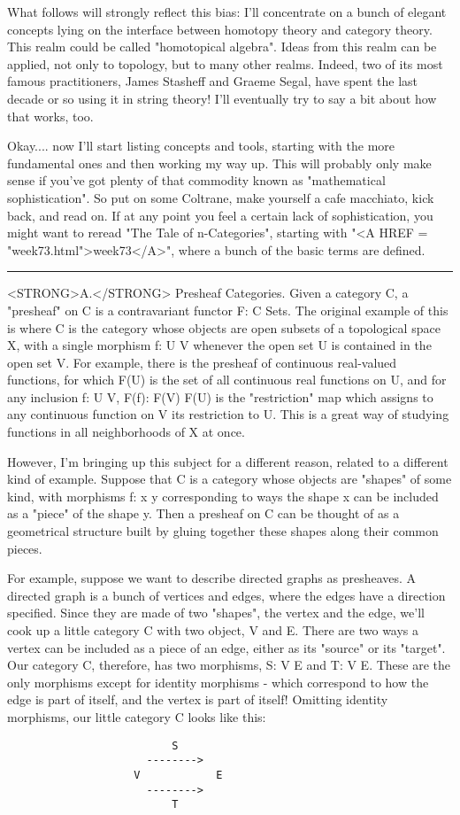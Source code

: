 What follows will strongly reflect this bias: I'll concentrate on a
bunch of elegant concepts lying on the interface between homotopy theory
and category theory.  This realm could be called "homotopical algebra".
Ideas from this realm can be applied, not only to topology, but to many
other realms.  Indeed, two of its most famous practitioners, James
Stasheff and Graeme Segal, have spent the last decade or so using it in
string theory!  I'll eventually try to say a bit about how that works,
too.

Okay.... now I'll start listing concepts and tools, starting with the
more fundamental ones and then working my way up.  This will probably
only make sense if you've got plenty of that commodity known as
"mathematical sophistication".  So put on some Coltrane, make yourself a
cafe macchiato, kick back, and read on.  If at any point you feel a
certain lack of sophistication, you might want to reread "The Tale of
n-Categories", starting with "<A HREF = "week73.html">week73</A>", where a bunch of the basic terms
are defined.
\par\noindent\rule{\textwidth}{0.4pt}
<STRONG>A.</STRONG>  Presheaf Categories.  Given a category C, a "presheaf" on C is a
contravariant functor F: C \to  Sets.  The original example of this is
where C is the category whose objects are open subsets of a topological
space X, with a single morphism f: U \to  V whenever the open set U is
contained in the open set V.  For example, there is the presheaf of
continuous real-valued functions, for which F(U) is the set of all
continuous real functions on U, and for any inclusion f: U \to  V, 
F(f): F(V) \to  F(U) is the "restriction" map which assigns to any
continuous function on V its restriction to U.  This is a great way of
studying functions in all neighborhoods of X at once.  

However, I'm bringing up this subject for a different reason, related to
a different kind of example.  Suppose that C is a category whose objects
are "shapes" of some kind, with morphisms f: x \to  y corresponding to
ways the shape x can be included as a "piece" of the shape y.  Then a
presheaf on C can be thought of as a geometrical structure built by
gluing together these shapes along their common pieces.  

For example, suppose we want to describe directed graphs as presheaves.
A directed graph is a bunch of vertices and edges, where the edges have
a direction specified.  Since they are made of two "shapes", the vertex
and the edge, we'll cook up a little category C with two object, V and
E.  There are two ways a vertex can be included as a piece of an edge,
either as its "source" or its "target".  Our category C, therefore, has
two morphisms, S: V \to  E and T: V \to  E.  These are the only morphisms
except for identity morphisms - which correspond to how the edge is
part of itself, and the vertex is part of itself!  Omitting identity
morphisms, our little category C looks like this:
\begin{verbatim}
                          S
                      -------->
                    V            E
                      -------->
                          T

\end{verbatim}
    

